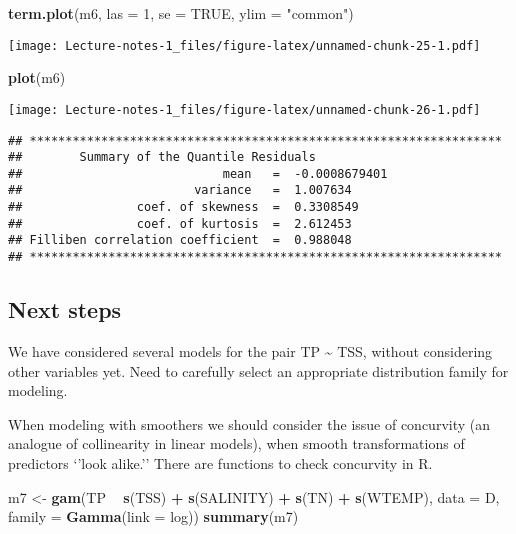 \documentclass[
]{book}
\newenvironment{Shaded}{\begin{snugshade}}{\end{snugshade}}
\newcommand{\DataTypeTok}[1]{\textcolor[rgb]{0.13,0.29,0.53}{#1}}
\newcommand{\DecValTok}[1]{\textcolor[rgb]{0.00,0.00,0.81}{#1}}
\newcommand{\KeywordTok}[1]{\textcolor[rgb]{0.13,0.29,0.53}{\textbf{#1}}}
\newcommand{\NormalTok}[1]{#1}
\newcommand{\OperatorTok}[1]{\textcolor[rgb]{0.81,0.36,0.00}{\textbf{#1}}}
\newcommand{\OtherTok}[1]{\textcolor[rgb]{0.56,0.35,0.01}{#1}}
\newcommand{\StringTok}[1]{\textcolor[rgb]{0.31,0.60,0.02}{#1}}
\begin{document}
\begin{Shaded}
\begin{Highlighting}[]
\KeywordTok{term.plot}\NormalTok{(m6, }\DataTypeTok{las =} \DecValTok{1}\NormalTok{, }\DataTypeTok{se =} \OtherTok{TRUE}\NormalTok{, }\DataTypeTok{ylim =} \StringTok{"common"}\NormalTok{)}
\end{Highlighting}
\end{Shaded}

\texttt{[image: Lecture-notes-1\_files/figure-latex/unnamed-chunk-25-1.pdf]}

\begin{Shaded}
\begin{Highlighting}[]
\KeywordTok{plot}\NormalTok{(m6)}
\end{Highlighting}
\end{Shaded}

\texttt{[image: Lecture-notes-1\_files/figure-latex/unnamed-chunk-26-1.pdf]}

\begin{verbatim}
## ******************************************************************
##        Summary of the Quantile Residuals
##                            mean   =  -0.0008679401 
##                        variance   =  1.007634 
##                coef. of skewness  =  0.3308549 
##                coef. of kurtosis  =  2.612453 
## Filliben correlation coefficient  =  0.988048 
## ******************************************************************
\end{verbatim}

\hypertarget{next-steps}{%
\subsection{Next steps}\label{next-steps}}

We have considered several models for the pair TP \textasciitilde{} TSS, without considering other variables yet. Need to carefully select an appropriate distribution family for modeling.

When modeling with smoothers we should consider the issue of concurvity (an analogue of collinearity in linear models), when smooth transformations of predictors `'look alike.'' There are functions to check concurvity in R.

\begin{Shaded}
\begin{Highlighting}[]
\NormalTok{m7 <-}\StringTok{ }\KeywordTok{gam}\NormalTok{(TP }\OperatorTok{~}\StringTok{ }\KeywordTok{s}\NormalTok{(TSS) }\OperatorTok{+}\StringTok{ }\KeywordTok{s}\NormalTok{(SALINITY) }\OperatorTok{+}\StringTok{ }\KeywordTok{s}\NormalTok{(TN) }\OperatorTok{+}\StringTok{ }\KeywordTok{s}\NormalTok{(WTEMP), }
          \DataTypeTok{data =}\NormalTok{ D, }\DataTypeTok{family =} \KeywordTok{Gamma}\NormalTok{(}\DataTypeTok{link =}\NormalTok{ log))}
\KeywordTok{summary}\NormalTok{(m7)}
\end{Highlighting}
\end{Shaded}
\end{document}
